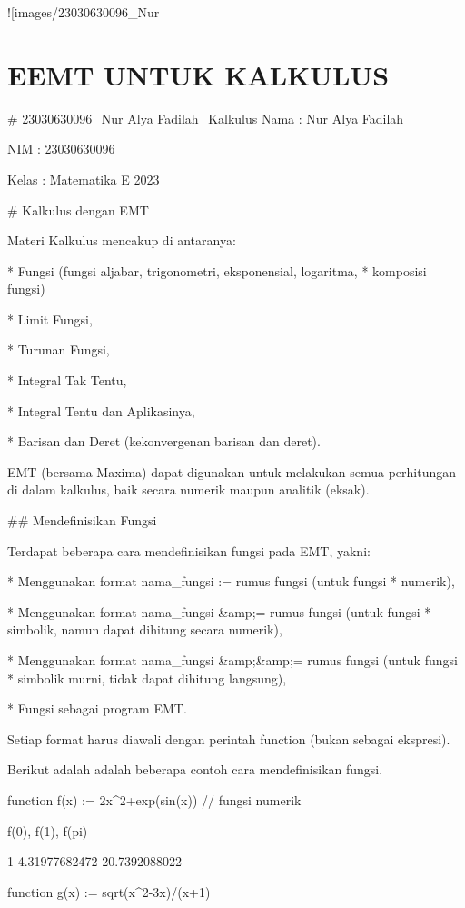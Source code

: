 \documentclass{article}
\begin{document}
![images/23030630096_Nur%

\section{EEMT UNTUK KALKULUS}
# 23030630096_Nur Alya Fadilah_Kalkulus
Nama  : Nur Alya Fadilah


NIM   : 23030630096


Kelas : Matematika E 2023


# Kalkulus dengan EMT

Materi Kalkulus mencakup di antaranya:


* 
Fungsi (fungsi aljabar, trigonometri, eksponensial, logaritma,
* komposisi fungsi)

* 
Limit Fungsi,

* 
Turunan Fungsi,

* 
Integral Tak Tentu,

* 
Integral Tentu dan Aplikasinya,

* 
Barisan dan Deret (kekonvergenan barisan dan deret).


EMT (bersama Maxima) dapat digunakan untuk melakukan semua perhitungan
di dalam kalkulus, baik secara numerik maupun analitik (eksak).


## Mendefinisikan Fungsi

Terdapat beberapa cara mendefinisikan fungsi pada EMT, yakni:


* 
Menggunakan format nama_fungsi := rumus fungsi (untuk fungsi
* numerik),

* 
Menggunakan format nama_fungsi &amp;= rumus fungsi (untuk fungsi
* simbolik, namun dapat dihitung secara numerik),

* 
Menggunakan format nama_fungsi &amp;&amp;= rumus fungsi (untuk fungsi
* simbolik murni, tidak dapat dihitung langsung),

* 
Fungsi sebagai program EMT.


Setiap format harus diawali dengan perintah function (bukan sebagai
ekspresi).


Berikut adalah adalah beberapa contoh cara mendefinisikan fungsi.


\>function f(x) := 2\*x^2+exp(sin(x)) // fungsi numerik

\>f(0), f(1), f(pi)


    1
    4.31977682472
    20.7392088022

\>function g(x) := sqrt(x^2-3\*x)/(x+1)
\end{document}
